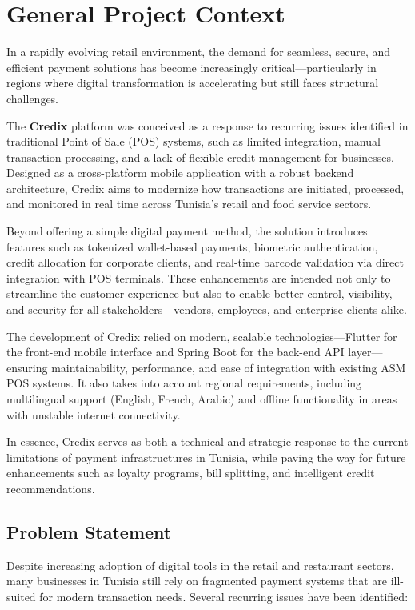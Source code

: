 \section{General Project Context}

In a rapidly evolving retail environment, the demand for seamless, secure, and efficient payment solutions has become increasingly critical—particularly in regions where digital transformation is accelerating but still faces structural challenges.

The \textbf{Credix} platform was conceived as a response to recurring issues identified in traditional Point of Sale (POS) systems, such as limited integration, manual transaction processing, and a lack of flexible credit management for businesses. Designed as a cross-platform mobile application with a robust backend architecture, Credix aims to modernize how transactions are initiated, processed, and monitored in real time across Tunisia's retail and food service sectors.

Beyond offering a simple digital payment method, the solution introduces features such as tokenized wallet-based payments, biometric authentication, credit allocation for corporate clients, and real-time barcode validation via direct integration with POS terminals. These enhancements are intended not only to streamline the customer experience but also to enable better control, visibility, and security for all stakeholders—vendors, employees, and enterprise clients alike.

The development of Credix relied on modern, scalable technologies—Flutter for the front-end mobile interface and Spring Boot for the back-end API layer—ensuring maintainability, performance, and ease of integration with existing ASM POS systems. It also takes into account regional requirements, including multilingual support (English, French, Arabic) and offline functionality in areas with unstable internet connectivity.

In essence, Credix serves as both a technical and strategic response to the current limitations of payment infrastructures in Tunisia, while paving the way for future enhancements such as loyalty programs, bill splitting, and intelligent credit recommendations.

\subsection{Problem Statement}

Despite increasing adoption of digital tools in the retail and restaurant sectors, many businesses in Tunisia still rely on fragmented payment systems that are ill-suited for modern transaction needs. Several recurring issues have been identified:

